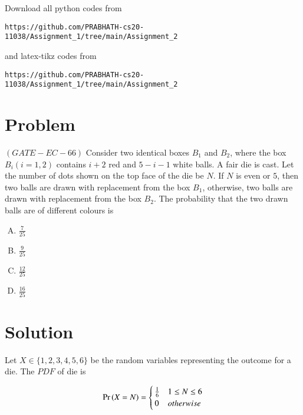\documentclass[journal,12pt,twocolumn]{IEEEtran}
\begin{document}
Download all python codes from 
\begin{lstlisting}
https://github.com/PRABHATH-cs20-11038/Assignment_1/tree/main/Assignment_2
\end{lstlisting}

and latex-tikz codes from
\begin{lstlisting}
https://github.com/PRABHATH-cs20-11038/Assignment_1/tree/main/Assignment_2
\end{lstlisting}

\section{Problem}

$(GATE-EC-66)$ Consider two identical boxes $B_1$ and $B_2$, where the box $B_i(i = 1, 2)$ contains $i + 2$ red and $5−i−1$ white balls. A fair die is cast. Let the number of dots shown on the top face of the die be $N$. If $N$ is even or $5$, then two balls are drawn with replacement from the box $B_1$, otherwise, two balls are drawn with replacement from the box $B_2$. The probability that the two drawn balls are of different colours is

\begin{enumerate}[(A)]
    \item $\frac{7}{25}$ \\
    
    \item $\frac{9}{25}$ \\
    
    \item $\frac{12}{25}$ \\
    
    \item $\frac{16}{25}$
\end{enumerate}

\section{Solution}

Let $X \in \{1,2,3,4,5,6\}$ be the random variables representing the outcome for a die. The $PDF$ of die is

\begin{align}
    \Pr\left(X=N\right) =
    \begin{cases}
    \frac{1}{6} & 1 \leq N \leq 6\\
    0 & otherwise
    \end{cases}
\end{align}
\end{document}
